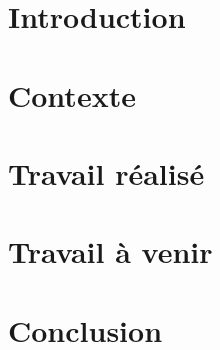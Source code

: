 \documentclass[12pt]{report}
\begin{document}
    

    \tableofcontents
    
    \chapter*{Introduction}
	

    \chapter{Contexte}

    \chapter{Travail réalisé}

    \chapter{Travail à venir}
        

    \chapter*{Conclusion}
	
\end{document}
